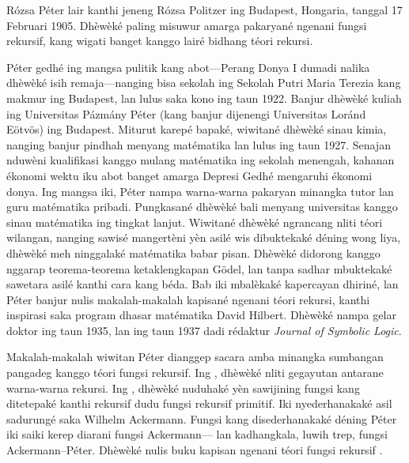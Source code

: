 \documentclass[../../../include/open-logic-section]{subfiles}
\begin{document}



R\'ozsa P\'eter lair kanthi jeneng
R\'ozsa Politzer ing Budapest, Hongaria,
tanggal 17 Februari 1905. Dhèwèké
paling misuwur amarga pakaryané ngenani
fungsi rekursif, kang wigati banget kanggo
lairé bidhang téori rekursi.

P\'eter gedhé ing mangsa pulitik kang
abot---Perang Donya I dumadi nalika
dhèwèké isih remaja---nanging bisa
sekolah ing Sekolah Putri Maria
Terezia kang makmur ing Budapest,
lan lulus saka kono ing taun 1922.
Banjur dhèwèké kuliah ing
Universitas P\'azm\'any P\'eter
(kang banjur dijenengi Universitas
Lor\'and E\"otv\"os) ing Budapest.
Miturut karepé bapaké, wiwitané
dhèwèké sinau kimia, nanging
banjur pindhah menyang matématika
lan lulus ing taun 1927.
Senajan nduwèni kualifikasi
kanggo mulang matématika ing
sekolah menengah, kahanan ékonomi
wektu iku abot banget amarga
Depresi Gedhé mengaruhi
ékonomi donya. Ing mangsa iki,
P\'eter nampa warna-warna
pakaryan minangka tutor lan
guru matématika pribadi.
Pungkasané dhèwèké bali
menyang universitas kanggo
sinau matématika ing tingkat
lanjut. Wiwitané dhèwèké
ngrancang nliti téori wilangan,
nanging sawisé mangertèni
yèn asilé wis dibuktekaké
déning wong liya, dhèwèké
meh ninggalaké matématika
babar pisan. Dhèwèké
didorong kanggo nggarap
teorema-teorema
ketaklengkapan G\"odel,
lan tanpa sadhar mbuktekaké
sawetara asilé kanthi cara
kang béda. Bab iki mbalèkaké
kapercayan dhiriné, lan
P\'eter banjur nulis
makalah-makalah kapisané
ngenani téori rekursi,
kanthi inspirasi saka
program dhasar matématika
David Hilbert. Dhèwèké
nampa gelar doktor ing taun
1935, lan ing taun 1937
dadi rédaktur \emph{Journal of
  Symbolic Logic}.

Makalah-makalah wiwitan
P\'eter dianggep sacara
amba minangka sumbangan
pangadeg kanggo téori
fungsi rekursif. Ing
\cite{Peter1935a}, dhèwèké
nliti gegayutan antarane
warna-warna rekursi.
Ing \cite{Peter1935b},
dhèwèké nuduhaké yèn
sawijining fungsi kang
ditetepaké kanthi
rekursif dudu fungsi
rekursif primitif. Iki
nyederhanakaké asil
sadurungé saka Wilhelm
Ackermann. Fungsi kang
disederhanakaké déning
P\'eter iki saiki kerep
diarani fungsi Ackermann---
lan kadhangkala, luwih
trep, fungsi Ackermann--P\'eter.
Dhèwèké nulis buku
kapisan ngenani téori
fungsi rekursif
\citep{Peter1951}.
\end{document}
